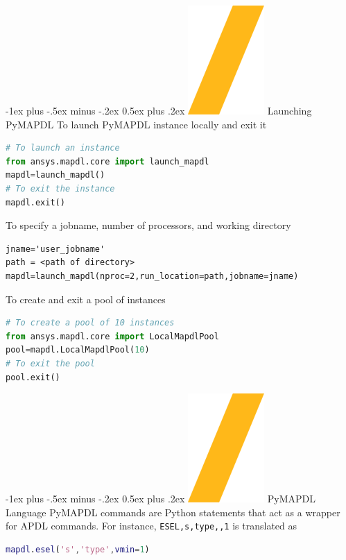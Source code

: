 \documentclass[9pt,landscape]{article}
\makeatletter
\renewcommand{\section}{\@startsection{section}{1}{0mm}%
                                {-1ex plus -.5ex minus -.2ex}%
                                {0.5ex plus .2ex}%
                                {\normalfont\large\bfseries}}
\def\code#1{\texttt{#1}}
\makeatother
\begin{document}
\begin{multicols}{3}
\setlength{\premulticols}{1pt}
\setlength{\postmulticols}{1pt}
\setlength{\multicolsep}{1pt}
\setlength{\columnsep}{2pt}

\section{\includegraphics[height=\fontcharht\font`\S]{slash.png} Launching PyMAPDL}
To launch PyMAPDL instance locally and exit it
\begin{lstlisting}[language=Python]
# To launch an instance
from ansys.mapdl.core import launch_mapdl
mapdl=launch_mapdl()
# To exit the instance
mapdl.exit()
\end{lstlisting}

To specify a jobname, number of processors, and working directory
\begin{lstlisting}[language=TeX]
jname='user_jobname'
path = <path of directory>
mapdl=launch_mapdl(nproc=2,run_location=path,jobname=jname)
\end{lstlisting}

To create and exit a pool of instances
\begin{lstlisting}[language=Python]
# To create a pool of 10 instances
from ansys.mapdl.core import LocalMapdlPool
pool=mapdl.LocalMapdlPool(10)
# To exit the pool
pool.exit()
\end{lstlisting}

\section{\includegraphics[height=\fontcharht\font`\S]{slash.png} PyMAPDL Language}
PyMAPDL commands are Python statements that act as a wrapper for APDL commands. For instance, \code{ESEL,s,type,,1} is translated as
\begin{lstlisting}[language=Matlab]
mapdl.esel('s','type',vmin=1) 
\end{lstlisting}


\end{multicols}
\end{document}
